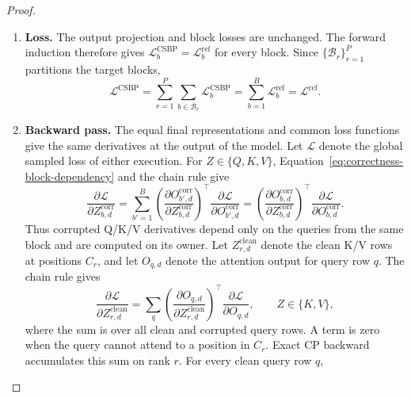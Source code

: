 \begin{proof}
\begin{enumerate}
\item
\textbf{Loss.}
The output projection and block losses are unchanged. The forward induction
therefore gives
$\mathcal L_b^{\mathrm{CSBP}}=\mathcal L_b^{\mathrm{ref}}$ for every block.
Since $\{\mathcal B_r\}_{r=1}^{P}$ partitions the target blocks,
\begin{equation}
    \mathcal L^{\mathrm{CSBP}}
    =\sum_{r=1}^{P}\sum_{b\in\mathcal B_r}\mathcal L_b^{\mathrm{CSBP}}
    =\sum_{b=1}^{B}\mathcal L_b^{\mathrm{ref}}
    =\mathcal L^{\mathrm{ref}}.
    \label{eq:correctness-sampled-loss}
\end{equation}

\item
\textbf{Backward pass.}
The equal final representations and common loss functions give the same
derivatives at the output of the model. Let $\mathcal L$ denote the global
sampled loss of either execution. For
$Z\in\{Q,K,V\}$,
Equation~\ref{eq:correctness-block-dependency} and the chain rule give
\begin{equation}
    \frac{\partial \mathcal L}{\partial Z_{b,d}^{\mathrm{corr}}}
    = \sum_{b'=1}^{B}
      \left(
      \frac{\partial O_{b',d}^{\mathrm{corr}}}
           {\partial Z_{b,d}^{\mathrm{corr}}}
      \right)^{\!\top}
      \frac{\partial \mathcal L}{\partial O_{b',d}^{\mathrm{corr}}}
    = \left(
      \frac{\partial O_{b,d}^{\mathrm{corr}}}
           {\partial Z_{b,d}^{\mathrm{corr}}}
      \right)^{\!\top}
      \frac{\partial \mathcal L}{\partial O_{b,d}^{\mathrm{corr}}}.
    \label{eq:correctness-corrupted-gradient}
\end{equation}
Thus corrupted Q/K/V derivatives depend only on the queries from the same
block and are computed on its owner. Let $Z_{r,d}^{\mathrm{clean}}$ denote the
clean K/V rows at positions $C_r$, and let $O_{q,d}$ denote the attention
output for query row $q$. The chain rule gives
\begin{equation}
    \frac{\partial \mathcal L}{\partial Z_{r,d}^{\mathrm{clean}}}
    = \sum_q
      \left(
        \frac{\partial O_{q,d}}{\partial Z_{r,d}^{\mathrm{clean}}}
      \right)^{\!\top}
      \frac{\partial \mathcal L}{\partial O_{q,d}},
    \qquad Z\in\{K,V\},
    \label{eq:correctness-clean-gradient}
\end{equation}
where the sum is over all clean and corrupted query rows. A term is zero when
the query cannot attend to a position in $C_r$. Exact CP backward accumulates
this sum on rank $r$. For every clean query row $q$,
\begin{equation}

\end{equation}
\end{enumerate}
\end{proof}
